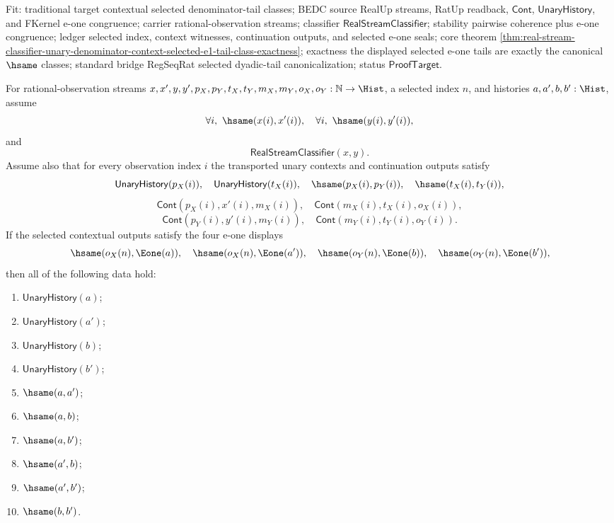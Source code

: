 Fit: traditional target contextual selected denominator-tail classes; BEDC
source RealUp streams, RatUp readback, $\mathsf{Cont}$,
$\mathsf{UnaryHistory}$, and FKernel e-one congruence; carrier
rational-observation streams; classifier $\mathsf{RealStreamClassifier}$;
stability pairwise coherence plus e-one congruence; ledger selected index,
context witnesses, continuation outputs, and selected e-one seals; core theorem
\autoref{thm:real-stream-classifier-unary-denominator-context-selected-e1-tail-class-exactness};
exactness the displayed selected e-one tails are exactly the canonical
$\hsame$ classes; standard bridge RegSeqRat selected dyadic-tail
canonicalization; status $\mathsf{ProofTarget}$.

\begin{theorem}
\label{thm:real-stream-classifier-transported-contextual-e1-tail-pairwise-coherence}
For rational-observation streams
$x,x',y,y',p_X,p_Y,t_X,t_Y,m_X,m_Y,o_X,o_Y:\mathbb{N}\to\Hist$, a
selected index $n$, and histories $a,a',b,b':\Hist$, assume
$$
\forall i,\ \hsame(x(i),x'(i)),\quad
\forall i,\ \hsame(y(i),y'(i)),
$$
and
$$
\mathsf{RealStreamClassifier}(x,y).
$$
Assume also that for every observation index $i$ the transported unary contexts
and continuation outputs satisfy
$$
\mathsf{UnaryHistory}(p_X(i)),\quad \mathsf{UnaryHistory}(t_X(i)),\quad
\hsame(p_X(i),p_Y(i)),\quad \hsame(t_X(i),t_Y(i)),
$$
$$
\mathsf{Cont}(p_X(i),x'(i),m_X(i)),\quad
\mathsf{Cont}(m_X(i),t_X(i),o_X(i)),
$$
$$
\mathsf{Cont}(p_Y(i),y'(i),m_Y(i)),\quad
\mathsf{Cont}(m_Y(i),t_Y(i),o_Y(i)).
$$
If the selected contextual outputs satisfy the four e-one displays
$$
\hsame(o_X(n),\Eone(a)),\quad
\hsame(o_X(n),\Eone(a')),\quad
\hsame(o_Y(n),\Eone(b)),\quad
\hsame(o_Y(n),\Eone(b')),
$$
then all of the following data hold:
\begin{enumerate}
\item $\mathsf{UnaryHistory}(a)$;
\item $\mathsf{UnaryHistory}(a')$;
\item $\mathsf{UnaryHistory}(b)$;
\item $\mathsf{UnaryHistory}(b')$;
\item $\hsame(a,a')$;
\item $\hsame(a,b)$;
\item $\hsame(a,b')$;
\item $\hsame(a',b)$;
\item $\hsame(a',b')$;
\item $\hsame(b,b')$.
\end{enumerate}
\end{theorem}
